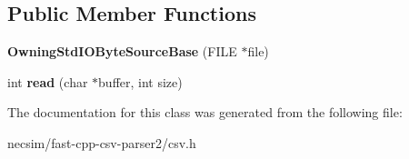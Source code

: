 \subsection*{Public Member Functions}
\begin{DoxyCompactItemize}
\item 
{\bfseries Owning\+Std\+I\+O\+Byte\+Source\+Base} (F\+I\+LE $\ast$file)\hypertarget{classio_1_1detail_1_1_owning_std_i_o_byte_source_base_a259f77d1a3c57720b54b88d9f8a3c018}{}\label{classio_1_1detail_1_1_owning_std_i_o_byte_source_base_a259f77d1a3c57720b54b88d9f8a3c018}

\item 
int {\bfseries read} (char $\ast$buffer, int size)\hypertarget{classio_1_1detail_1_1_owning_std_i_o_byte_source_base_a9269e7bfd07ebf2fa3518912fe7bebd0}{}\label{classio_1_1detail_1_1_owning_std_i_o_byte_source_base_a9269e7bfd07ebf2fa3518912fe7bebd0}

\end{DoxyCompactItemize}


The documentation for this class was generated from the following file\+:\begin{DoxyCompactItemize}
\item 
necsim/fast-\/cpp-\/csv-\/parser2/csv.\+h\end{DoxyCompactItemize}
